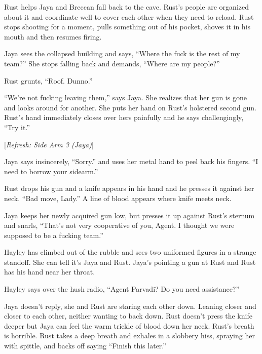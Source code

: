 Rust helps Jaya and Breccan fall back to the cave.  Rust's people are organized about it and coordinate well to cover each other when they need to reload.  Rust stops shooting for a moment, pulls something out of his pocket, shoves it in his mouth and then resumes firing.



Jaya sees the collapsed building and says, ``Where the fuck is the rest of my team?''  She stops falling back and demands, ``Where are my people?''

Rust grunts, ``Roof.  Dunno.''

``We're not fucking leaving them,'' says Jaya.  She realizes that her gun is gone and looks around for another.   She puts her hand on Rust's holstered second gun.  Rust's hand immediately closes over hers painfully and he says challengingly, ``Try it.''  

{[}\textit{Refresh: Side Arm 3 (Jaya)}{]}

Jaya says insincerely, ``Sorry.'' and uses her metal hand to peel back his fingers. ``I need to borrow your sidearm.''

Rust drops his gun and a knife appears in his hand and he presses it against her neck. ``Bad move, Lady.'' A line of blood appears where knife meets neck.

Jaya keeps her newly acquired gun low, but presses it up against Rust's sternum and snarls, ``That's not very cooperative of you, Agent.  I thought we were supposed to be a fucking team.''



Hayley has climbed out of the rubble and sees two uniformed figures in a strange standoff.  She can tell it's Jaya and Rust.  Jaya's pointing a gun at Rust and Rust has his hand near her throat.


  {\color[RGB]{255,153,0} } 

Hayley says over the hush radio, ``Agent Parvadi?  Do you need assistance?''

Jaya doesn't reply, she and Rust are staring each other down.  Leaning closer and closer to each other, neither wanting to back down.  Rust doesn't press the knife deeper but Jaya can feel the warm trickle of blood down her neck.  Rust's breath is horrible.  Rust takes a deep breath and exhales in a slobbery hiss, spraying her with spittle, and backs off saying ``Finish this later.''



